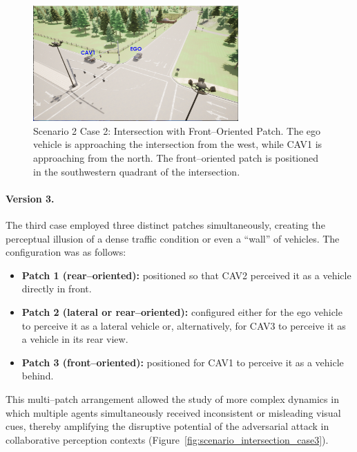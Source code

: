 \begin{figure}[H]
    \centering 
    \includegraphics[width=0.7\textwidth]{figures/experiments/scenario2_v2.png}
    \caption{Scenario 2 Case 2: Intersection with Front–Oriented Patch. The ego vehicle is approaching the intersection from the west, while CAV1 is approaching from the north. The front–oriented patch is positioned in the southwestern quadrant of the intersection.}
    \label{fig:scenario_intersection_case2}
\end{figure}

\paragraph{Version 3.}  
The third case employed three distinct patches simultaneously, creating the perceptual illusion of a dense traffic condition or even a “wall” of vehicles. The configuration was as follows:  
\begin{itemize}
    \item \textbf{Patch 1 (rear–oriented):} positioned so that CAV2 perceived it as a vehicle directly in front.  
    \item \textbf{Patch 2 (lateral or rear–oriented):} configured either for the ego vehicle to perceive it as a lateral vehicle or, alternatively, for CAV3 to perceive it as a vehicle in its rear view.  
    \item \textbf{Patch 3 (front–oriented):} positioned for CAV1 to perceive it as a vehicle behind.  
\end{itemize}  
This multi–patch arrangement allowed the study of more complex dynamics in which multiple agents simultaneously received inconsistent or misleading visual cues, thereby amplifying the disruptive potential of the adversarial attack in collaborative perception contexts (Figure~\ref{fig:scenario_intersection_case3}).

